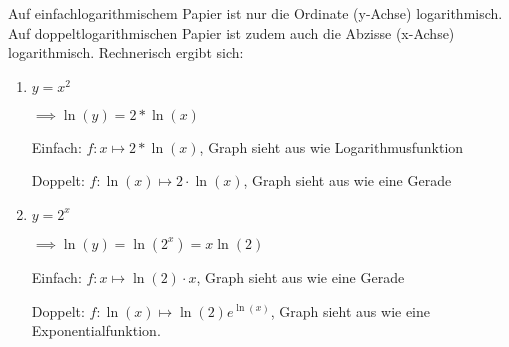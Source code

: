 \item 

Auf einfachlogarithmischem Papier ist nur die Ordinate (y-Achse) logarithmisch. Auf doppeltlogarithmischen Papier ist zudem auch die Abzisse (x-Achse) logarithmisch. Rechnerisch ergibt sich:

\begin{enumerate}
\item
$y=x^2$

$\implies \ln(y) = 2*\ln(x)$

Einfach: $f: x \mapsto 2*\ln(x)$, Graph sieht aus wie Logarithmusfunktion

Doppelt: $f: \ln(x) \mapsto 2 \cdot \ln(x)$, Graph sieht aus wie eine Gerade

\item

$y = 2^x$

$\implies \ln(y) = \ln(2^x) = x \ln(2)$

Einfach: $f: x \mapsto \ln(2) \cdot x$, Graph sieht aus wie eine Gerade

Doppelt: $f: \ln(x) \mapsto \ln(2) e^{\ln(x)}$, Graph sieht aus wie eine Exponentialfunktion.
\end{enumerate}

